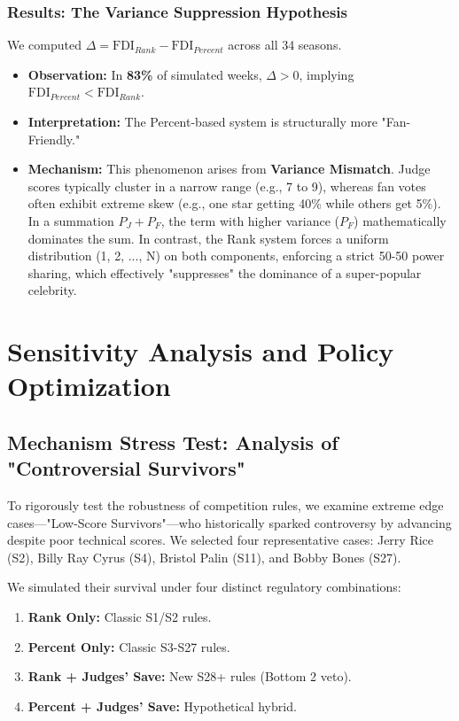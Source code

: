 \subsubsection{Results: The Variance Suppression Hypothesis}
We computed $\Delta = \text{FDI}_{Rank} - \text{FDI}_{Percent}$ across all 34 seasons.
\begin{itemize}
    \item \textbf{Observation:} In \textbf{83\%} of simulated weeks, $\Delta > 0$, implying $\text{FDI}_{Percent} < \text{FDI}_{Rank}$.
    \item \textbf{Interpretation:} The Percent-based system is structurally more "Fan-Friendly."
    \item \textbf{Mechanism:} This phenomenon arises from \textbf{Variance Mismatch}. Judge scores typically cluster in a narrow range (e.g., 7 to 9), whereas fan votes often exhibit extreme skew (e.g., one star getting 40\% while others get 5\%). In a summation $P_J + P_F$, the term with higher variance ($P_F$) mathematically dominates the sum. In contrast, the Rank system forces a uniform distribution (1, 2, ..., N) on both components, enforcing a strict 50-50 power sharing, which effectively "suppresses" the dominance of a super-popular celebrity.
\end{itemize}

\section{Sensitivity Analysis and Policy Optimization}

\subsection{Mechanism Stress Test: Analysis of "Controversial Survivors"}
To rigorously test the robustness of competition rules, we examine extreme edge cases—"Low-Score Survivors"—who historically sparked controversy by advancing despite poor technical scores. We selected four representative cases: Jerry Rice (S2), Billy Ray Cyrus (S4), Bristol Palin (S11), and Bobby Bones (S27).

We simulated their survival under four distinct regulatory combinations:
\begin{enumerate}
    \item \textbf{Rank Only:} Classic S1/S2 rules.
    \item \textbf{Percent Only:} Classic S3-S27 rules.
    \item \textbf{Rank + Judges' Save:} New S28+ rules (Bottom 2 veto).
    \item \textbf{Percent + Judges' Save:} Hypothetical hybrid.
\end{enumerate}

